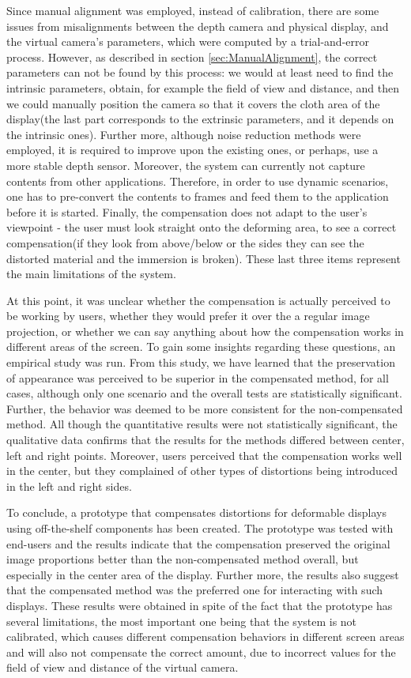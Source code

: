 \documentclass[]{article}
\begin{document}
Since manual alignment was employed, instead of calibration, there are some issues from misalignments between the depth camera and physical display, and the virtual camera's parameters, which were computed by a trial-and-error process. However, as described in section \ref{sec:ManualAlignment}, the correct parameters can not be found by this process: we would at least need to find the intrinsic parameters, obtain, for example the field of view and distance, and then we could manually position the camera so that it covers the cloth area of the display(the last part corresponds to the extrinsic parameters, and it depends on the intrinsic ones). Further more, although noise reduction methods were employed, it is required to improve upon the existing ones, or perhaps, use a more stable depth sensor. Moreover, the system can currently not capture contents from other applications. Therefore, in order to use dynamic scenarios, one has to pre-convert the contents to frames and feed them to the application before it is started. Finally, the compensation does not adapt to the user's viewpoint - the user must look straight onto the deforming area, to see a correct compensation(if they look from above/below or the sides they can see the distorted material and the immersion is broken). These last three items represent the main limitations of the system. 

At this point, it was unclear whether the compensation is actually perceived to be working by users, whether they would prefer it over the a regular image projection, or whether we can say anything about how the compensation works in different areas of the screen. To gain some insights regarding these questions, an empirical study was run. From this study, we have learned that the preservation of appearance was perceived to be superior in the compensated method, for all cases, although only one scenario and the overall tests are statistically significant. Further, the behavior was deemed to be more consistent for the non-compensated method. All though the quantitative results were not statistically significant, the qualitative data confirms that the results for the methods differed between center, left and right points. Moreover, users perceived that the compensation works well in the center, but they complained of other types of distortions being introduced in the left and right sides.

To conclude, a prototype that compensates distortions for deformable displays using off-the-shelf components has been created. The prototype was tested with end-users and the results indicate that the compensation preserved the original image proportions better than the non-compensated method overall, but especially in the center area of the display. Further more, the results also suggest that the compensated method was the preferred one for interacting with such displays. These results were obtained in spite of the fact that the prototype has several limitations, the most important one being that the system is not calibrated, which causes different compensation behaviors in different screen areas and will also not compensate the correct amount, due to incorrect values for the field of view and distance of the virtual camera.
\end{document}

